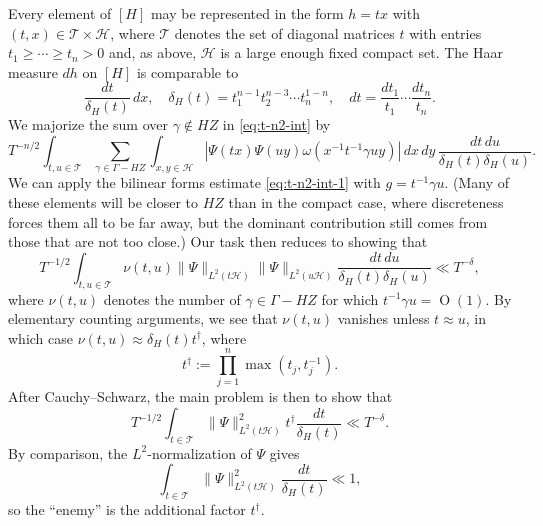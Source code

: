 \documentclass[reqno]{amsart}
\def\O{\operatorname{O}}
\theoremstyle{plain} \newtheorem{theorem} {Theorem}
\theoremstyle{definition} \newtheorem{definition} [theorem] {Definition}
\theoremstyle{itplain} %
\numberwithin{equation}{section}
\numberwithin{theorem}{section}
\renewcommand{\geq}{\geqslant}
\begin{document}
Every element of $[H]$ may be represented in the form $h = t x$ with $(t,x) \in \mathcal{T} \times \mathcal{H}$, where $\mathcal{T}$ denotes the set of diagonal matrices $t$ with entries $t_1 \geq \dotsb \geq t_n > 0$ and, as above, $\mathcal{H}$ is a large enough fixed compact set.  The Haar measure $d h$ on $[H]$ is comparable to
\begin{equation*}
  \frac{d t}{\delta_H(t)} \, d x,
  \quad \delta_H(t) = t_1^{n-1} t_2^{n-3} \dotsb t_n^{1-n},
  \quad
  d t = \frac{d t_1}{t_1} \dotsb \frac{d t_n}{t_n}.
\end{equation*}
  We majorize the sum over $\gamma \notin H Z$ in \eqref{eq:t-n2-int} by
\begin{equation*}
  T^{-n/2}   \int _{t, u \in \mathcal{T}  }
  \sum _{\gamma \in \Gamma  - H Z}
  \int _{x,y \in \mathcal{H} }
  \left\lvert
    \Psi(t x)
    \Psi(u y)
    \omega(x^{-1} t^{-1}  \gamma u y) 
  \right\rvert
  \, d x \, d y \, \frac{d t \, d u}{\delta_H(t) \delta_H(u)}.
\end{equation*}
We can apply the bilinear forms estimate \eqref{eq:t-n2-int-1} with $g = t^{-1} \gamma u$.  (Many of these elements will be closer to $H Z$ than in the compact case, where discreteness forces them all to be far away, but the dominant contribution still comes from those that are not too close.)  Our task then reduces to showing that
\begin{equation*}
  T^{-1/2}
  \int _{t, u \in \mathcal{T} }
  \nu(t,u)
  \|\Psi \|_{L^2(t \mathcal{H})}
  \|\Psi \|_{L^2(u \mathcal{H})}
  \frac{d t \, d u}{\delta_H(t) \delta_H(u)} \ll T^{-\delta},
\end{equation*}
where $\nu(t,u)$ denotes the number of $\gamma \in \Gamma - H Z$ for which $t^{-1} \gamma u = \O(1)$.  By elementary counting arguments, we see that $\nu(t,u)$ vanishes unless $t \approx u$, in which case $\nu(t,u) \approx \delta_H(t) t ^\dagger$, where
\begin{equation}\label{eq:t-dagger-:=}
  t ^\dagger := \prod_{j=1}^n \max(t_j, t_j^{-1}).
\end{equation}
After Cauchy--Schwarz, the main problem is then to show that
\begin{equation}\label{eq:t-14-int}
  T^{-1/2}
  \int _{t  \in \mathcal{T} }
  \|\Psi \|_{L^2(t \mathcal{H})}^2
  t ^\dagger 
  \frac{d t}{\delta_H(t)} \ll T^{-\delta}.
\end{equation}
By comparison, the $L^2$-normalization of $\Psi$ gives
\begin{equation*}
  \int _{t  \in \mathcal{T} }
  \|\Psi \|_{L^2(t \mathcal{H})}^2
  \frac{d t}{\delta_H(t)} \ll 1,
\end{equation*}
so the ``enemy'' is the additional factor $t ^\dagger$.
\end{document}
